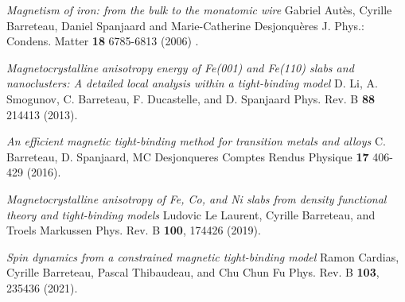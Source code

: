 \documentclass{article}
\begin{document}
\begin{thebibliography}{200}

\textit{Magnetism of iron: from the bulk to the monatomic wire} Gabriel Autès, Cyrille Barreteau, Daniel Spanjaard and Marie-Catherine Desjonquères J. Phys.: Condens. Matter \textbf{18} 6785-6813 (2006) .

\textit{Magnetocrystalline anisotropy energy of Fe(001) and Fe(110) slabs and nanoclusters: A detailed local analysis within a tight-binding model} D. Li, A. Smogunov, C. Barreteau, F. Ducastelle, and D. Spanjaard Phys. Rev. B \textbf{88} 214413 (2013).

\textit{An efficient magnetic tight-binding method for transition metals and alloys} C. Barreteau, D. Spanjaard, MC Desjonqueres Comptes Rendus Physique \textbf{17} 406-429 (2016).

\textit{Magnetocrystalline anisotropy of Fe, Co, and Ni slabs from density functional theory and tight-binding models} Ludovic Le Laurent, Cyrille Barreteau, and Troels Markussen Phys. Rev. B \textbf{100}, 174426 (2019).

\textit{Spin dynamics from a constrained magnetic tight-binding model} Ramon Cardias, Cyrille Barreteau, Pascal Thibaudeau, and Chu Chun Fu Phys. Rev. B \textbf{103}, 235436 (2021).

\end{thebibliography}
\end{document}
